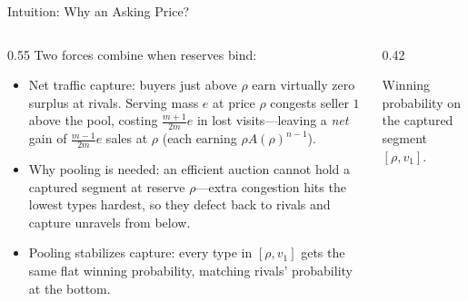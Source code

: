 \documentclass[11pt,aspectratio=169,handout]{beamer}
\def\meditem{\smallskip\item}
\begin{document}
\begin{frame}{Intuition: Why an Asking Price?}
\begin{columns}[T]
\begin{column}{0.55\textwidth}
Two forces combine when reserves bind:
\begin{itemize}
\item \alert{Net traffic capture}: buyers just above $\rho$ earn virtually zero surplus at rivals. Serving mass $e$ at price $\rho$ congests seller $1$ above the pool, costing $\frac{m+1}{2m}e$ in lost visits---leaving a \emph{net} gain of $\frac{m-1}{2m}e$ sales at $\rho$ (each earning $\rho A(\rho)^{n-1}$).
\meditem \alert{Why pooling is needed}: an efficient auction cannot hold a captured segment at reserve $\rho$---extra congestion hits the lowest types hardest, so they defect back to rivals and capture unravels from below.
\meditem<2-> \alert{Pooling stabilizes capture}: every type in $[\rho,v_1]$ gets the same flat winning probability, matching rivals' probability at the bottom.
\end{itemize}
\end{column}
\begin{column}{0.42\textwidth}
\centering{}

{\scriptsize Winning probability on the captured segment $[\rho,v_1]$.}
\end{column}
\end{columns}
\end{frame}
\end{document}
